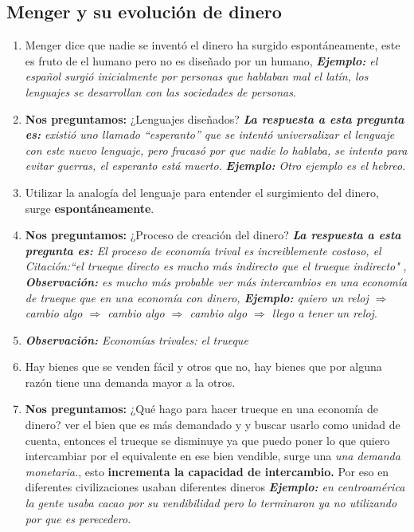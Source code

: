 \subsection{Menger y su evolución de dinero}
\begin{enumerate}
    \item Menger dice que nadie se inventó el dinero ha surgido espontáneamente, este es fruto de el humano pero no es diseñado por un humano, \emph{\textbf{Ejemplo: }el español surgió inicialmente por personas que hablaban mal el latín, los lenguajes se desarrollan con las sociedades de personas}.
    \item \textbf{Nos preguntamos:} ¿Lenguajes diseñados? \emph{\textbf{La respuesta a esta pregunta es: }existió uno llamado ``esperanto'' que se intentó universalizar el lenguaje con este nuevo lenguaje, pero fracasó por que nadie lo hablaba, se intento para evitar guerras, el esperanto está muerto.} \emph{\textbf{Ejemplo: }Otro ejemplo es el hebreo}.
    \item Utilizar la analogía del lenguaje para entender el surgimiento del dinero, surge \textbf{espontáneamente}.
    \item \textbf{Nos preguntamos:} ¿Proceso de creación del dinero? \emph{\textbf{La respuesta a esta pregunta es: }El proceso de economía trival es increiblemente costoso, el \emph{Citación:``el trueque directo es mucho más indirecto que el trueque indirecto"} }, \emph{\textbf{Observación: }es mucho más probable ver más intercambios en una economía de trueque que en una economía con dinero, \emph{\textbf{Ejemplo: }quiero un reloj $\Rightarrow$ cambio algo $\Rightarrow$ cambio algo $\Rightarrow$ cambio algo $\Rightarrow$ llego a tener un reloj}}.
    \item \emph{\textbf{Observación: }Economías trivales: el trueque}
    \item Hay bienes que se venden fácil y otros que no, hay bienes que por alguna razón tiene una demanda mayor a la otros.
    \item \textbf{Nos preguntamos:} ¿Qué hago para hacer trueque en una economía de dinero? ver el bien que es más demandado y y buscar usarlo como unidad de cuenta, entonces el trueque se disminuye ya que puedo poner lo que quiero intercambiar por el equivalente en ese bien vendible, surge una \emph{una demanda monetaria.}, esto \textbf{incrementa la capacidad de intercambio.} Por eso en diferentes civilizaciones usaban diferentes dineros \emph{\textbf{Ejemplo: }en centroamérica la gente usaba cacao por su vendibilidad pero lo terminaron ya no utilizando por que es perecedero.}

\end{enumerate}
